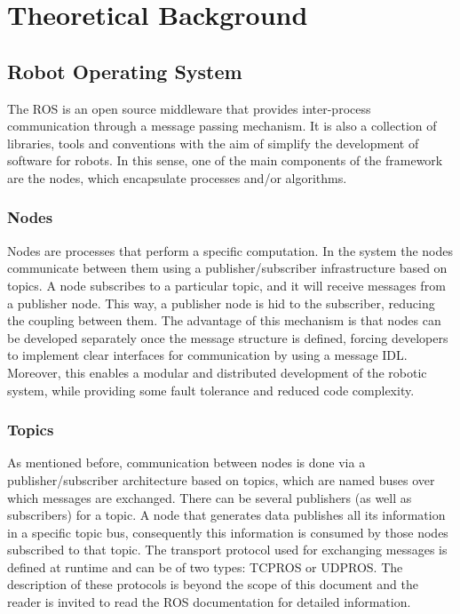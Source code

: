 \chapter{Theoretical Background}
\label{ch:chapter1}

\section{Robot Operating System}
\label{sec:chapter1:ros}
The \ac{ROS} \nocite{ros-website} is an open source middleware that provides inter-process communication through a message passing mechanism. It is also a collection of libraries, tools and conventions with the aim of simplify the development of software for robots. In this sense, one of the main components of the framework are the nodes, which encapsulate processes and/or algorithms.

\subsection{Nodes}
\label{subsec:chapter1:ros:nodes}
Nodes are processes that perform a specific computation. In the system the nodes communicate between them using a publisher/subscriber infrastructure based on topics. A node subscribes to a particular topic, and it will receive messages from a publisher node. This way, a publisher node is hid to the subscriber, reducing the coupling between them. The advantage of this mechanism is that nodes can be developed separately once the message structure is defined, forcing developers to implement clear interfaces for communication by using a message \ac{IDL}. Moreover, this enables a modular and distributed development of the robotic system, while providing some fault tolerance and reduced code complexity.

\subsection{Topics}
\label{subsec:chapter1:ros:topics}
As mentioned before, communication between nodes is done via a publisher/subscriber architecture based on topics, which are named buses over which messages are exchanged. There can be several publishers (as well as subscribers) for a topic. A node that generates data publishes all its information in a specific topic bus, consequently this information is consumed by those nodes subscribed to that topic. The transport protocol used for exchanging messages is defined at runtime and can be of two types: TCPROS or UDPROS. The description of these protocols is beyond the scope of this document and the reader is invited to read the ROS documentation for detailed information.

